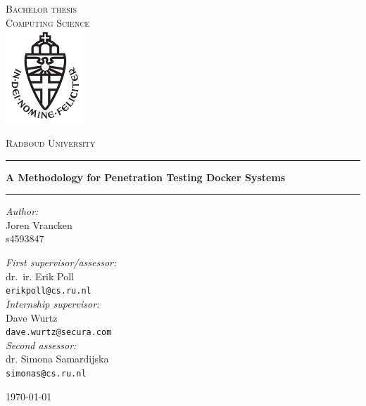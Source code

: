 \documentclass[11pt,a4paper]{report}
\begin{document}
    \hypersetup{pageanchor=false}
    \begin{titlepage}
        \begin{center}
            \textsc{\LARGE Bachelor thesis\\Computing Science}\\[1.5cm]
            \includegraphics[height=100pt]{resources/images/logo}

            \vspace{0.4cm}
            \textsc{\Large Radboud University}\\[1cm]
            \hrule
            \vspace{0.4cm}
            \textbf{\huge A Methodology for Penetration Testing Docker Systems}\\[0.4cm]
            \hrule
            \vspace{2cm}
            \begin{minipage}[t]{0.45\textwidth}
                \begin{flushleft} \large
                    \textit{Author:}\\
                    Joren Vrancken\\
                    s4593847
                \end{flushleft}
            \end{minipage}
            \begin{minipage}[t]{0.45\textwidth}
                \begin{flushright} \large
                    \textit{First supervisor/assessor:}\\
                    dr.\ ir. Erik Poll\\
                    \texttt{erikpoll@cs.ru.nl}\\[1.3cm]
                    \textit{Internship supervisor:}\\
                    Dave Wurtz\\
                    \texttt{dave.wurtz@secura.com}\\[1.3cm]
                    \textit{Second assessor:}\\
                    dr. Simona Samardijska\\
                    \texttt{simonas@cs.ru.nl}\\
                \end{flushright}
            \end{minipage}
            \vfill {\large \today}
        \end{center}
    \end{titlepage}
\end{document}
